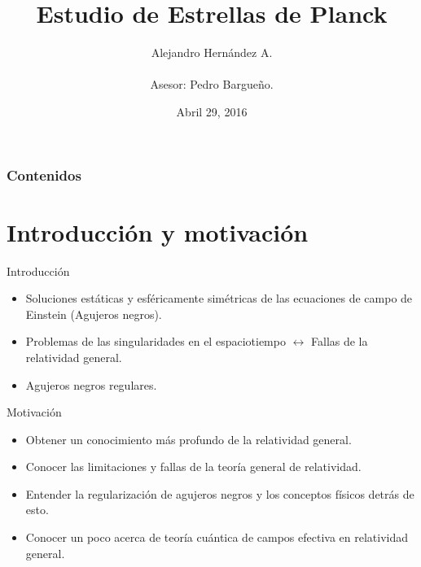 \documentclass[t]{beamer}
\title[Estrellas de Planck]{Estudio de Estrellas de Planck}
\author[Alejandro Hernández A.]{Alejandro Hernández A. \\ {\ \\ \footnotesize Asesor: Pedro Bargueño.} }
\institute[Uniandes]  
{\normalsize
Universidad de los Andes, Bogotá, Colombia \\ 
}
\date{Abril 29, 2016}
\numberwithin{equation}{section}
\begin{document}
\begin{frame}
\titlepage 
\end{frame}

\begin{frame}
\frametitle{Contenidos} 
\tableofcontents 
\end{frame}

\section{Introducción y motivación}

\begin{frame}{Introducción}
\vspace{\fill}
\begin{itemize}
\item Soluciones estáticas y esféricamente simétricas de las ecuaciones de campo de Einstein (Agujeros negros).
\vspace*{\fill}

\item Problemas de las singularidades en el espaciotiempo $\leftrightarrow$ Fallas de la relatividad general.
\vspace{\fill}

\item Agujeros negros regulares.
\end{itemize}
\end{frame}

\begin{frame}{Motivación}
\vspace{\fill}
\begin{itemize}
\item Obtener un conocimiento más profundo de la relatividad general.
\vspace*{\fill}

\item Conocer las limitaciones y fallas de la teoría general de relatividad.
\vspace*{\fill}

\item Entender la regularización de agujeros negros y los conceptos físicos detrás de esto.
\vspace*{\fill}

\item Conocer un poco acerca de teoría cuántica de campos efectiva en relatividad general.
\vspace*{\fill}

\end{itemize}
\vspace{\fill}
\end{frame}
\end{document}
